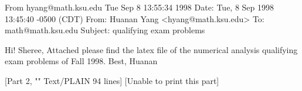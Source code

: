 From hyang@math.ksu.edu Tue Sep  8 13:55:34 1998
Date: Tue, 8 Sep 1998 13:45:40 -0500 (CDT)
From: Huanan Yang <hyang@math.ksu.edu>
To: math@math.ksu.edu
Subject: qualifying exam problems


Hi! Sheree,
    Attached please find the latex file of the numerical analysis
qualifying exam problems of Fall 1998.
    Best,
Huanan

  [Part 2, ""  Text/PLAIN  94 lines]
  [Unable to print this part]

